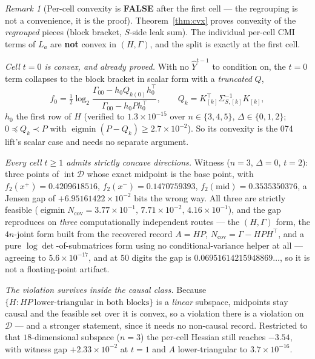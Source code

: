 \documentclass[11pt]{article}
\theoremstyle{definition}
\theoremstyle{remark}
\newtheorem{remark}{Remark}
\begin{document}
\begin{remark}[Per-cell convexity is \textbf{FALSE} after the first cell
--- the regrouping is not a convenience, it is the proof]
\label{rem:percell}
Theorem~\ref{thm:cvx} proves convexity of the \emph{regrouped}
pieces (block bracket, $S$-side leak sum). The individual per-cell CMI
terms of $L_a$ are \textbf{not} convex in $(H,\Gamma)$, and the split is
exactly at the first cell.

\emph{Cell $t=0$ is convex, and already proved.} With no $\hat Y^{t-1}$ to
condition on, the $t=0$ term collapses to the block bracket in scalar form
with a \emph{truncated} $Q$,
\[
f_0=\tfrac12\log_2\frac{\Gamma_{00}-h_0Q_{k(0)}h_0^{\!\top}}
                        {\Gamma_{00}-h_0Ph_0^{\!\top}},
\qquad
Q_k=K_{[k]}^{\!\top}\Sigma_{S,[k]}^{-1}K_{[k]},
\]
$h_0$ the first row of $H$ (verified to $1.3\times10^{-15}$ over
$n\in\{3,4,5\}$, $\Delta\in\{0,1,2\}$; $0\preceq Q_k\prec P$ with
$\operatorname{eigmin}(P-Q_k)\ge2.7\times10^{-2}$). So its convexity is the
074 lift's scalar case and needs no separate argument.

\emph{Every cell $t\ge1$ admits strictly concave directions.} Witness
($n=3$, $\Delta=0$, $t=2$): three points of $\operatorname{int}\mathcal D$
whose exact midpoint is the base point, with
$f_2(x^+)=0.4209618516$, $f_2(x^-)=0.1470759393$,
$f_2(\mathrm{mid})=0.3535350376$, a Jensen gap of
$+6.95161422\times10^{-2}$ bits the wrong way. All three are strictly
feasible ($\operatorname{eigmin}N_{\mathrm{cov}}
=3.77\times10^{-1},\,7.71\times10^{-2},\,4.16\times10^{-1}$), and the gap
reproduces on \emph{three} computationally independent routes --- the
$(H,\Gamma)$ form, the $4n$-joint form built from the recovered record
$A=HP$, $N_{\mathrm{cov}}=\Gamma-HPH^{\!\top}$, and a pure
$\log\det$-of-submatrices form using no conditional-variance helper at all
--- agreeing to $5.6\times10^{-17}$, and at $50$ digits the gap is
$0.06951614215948869\ldots$, so it is not a floating-point artifact.

\emph{The violation survives inside the causal class.} Because
$\{H:HP\ \text{lower-triangular in both blocks}\}$ is a \emph{linear}
subspace, midpoints stay causal and the feasible set over it is convex, so a
violation there is a violation on $\mathcal D$ --- and a stronger statement,
since it needs no non-causal record. Restricted to that $18$-dimensional
subspace ($n=3$) the per-cell Hessian still reaches
$-3.54$, with witness gap $+2.33\times10^{-2}$ at $t=1$ and $A$
lower-triangular to $3.7\times10^{-16}$.


\end{remark}
\end{document}
